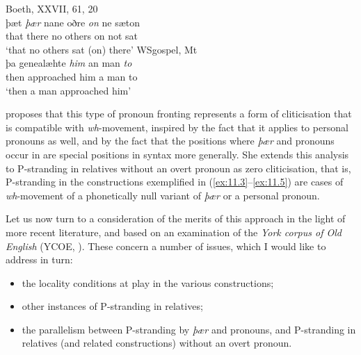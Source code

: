 \documentclass[output=paper]{langsci/langscibook}
\begin{document}
\ea%
    \label{ex:11.7}
	\ea Boeth, XXVII, 61, 20\\
	\gll þæt \textit{þær}   nane oðre    \textit{on} ne sæton   \\
       		that there no    others on  not sat \\
   	\glt ‘that no others sat (on) there’
	\ex WSgospel, Mt\\
	\gll þa    genealæhte  \textit{him} an man \textit{to}  \\
		then approached him  a   man to\\
	\glt ‘then a man approached him’
	\z
\z

 proposes that this type of pronoun
fronting
represents a form of cliticisation that is compatible with
\textit{wh}-movement, inspired by the fact that it applies to personal pronouns
as well, and by the fact that the positions where \textit{þær} and pronouns
occur in  are special positions in  syntax more generally. She
extends this analysis to P-stranding in relatives without an overt pronoun as
zero cliticisation, that is, P-stranding in the constructions exemplified in
(\ref{ex:11.3}--\ref{ex:11.5}) are cases of \textit{wh}-movement of a phonetically null variant of
\textit{þær} or a personal pronoun.

Let us now turn to a consideration of the merits of this approach in the light
of more recent literature, and based on an examination of the \textit{York
corpus of Old English} (YCOE, \citealt{Tayloretal2003}). These concern a number
of issues, which I would like to address in turn:

\begin{itemize}

    \item the locality conditions at play in the various constructions;

    \item other instances of P-stranding in
        relatives;

    \item the parallelism between P-stranding by
        \textit{þær} and pronouns, and P-strand\-ing in
        relatives (and related constructions) without an overt pronoun.

\end{itemize}
\end{document}
